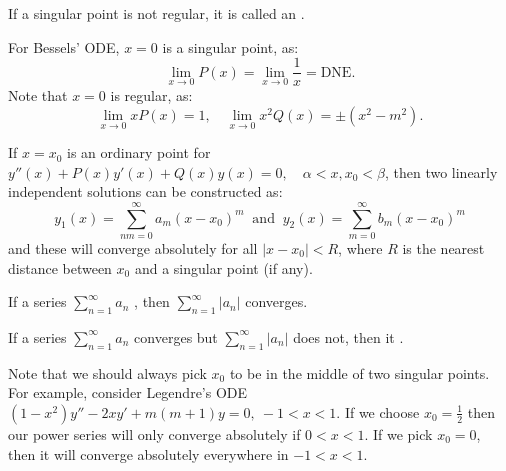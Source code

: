 \documentclass[../main/main.tex]{subfiles}
\begin{document}
\begin{definition}
	If a singular point is not regular, it is called an .
\end{definition}
\begin{remark}
	For Bessels' ODE, $x=0$ is a singular point, as: \[
		\lim\limits_{x \to 0} P(x) = \lim\limits_{x \to 0} \frac{1}{x} = \text{DNE}
	.\] Note that $x=0$ is regular, as: \[
	\lim\limits_{x \to 0} xP(x) = 1,\quad \lim\limits_{x \to 0} x^2Q(x) = \pm(x^2-m^2)
	.\] 
\end{remark}
\begin{theorem}
	If $x=x_0$ is an ordinary point for $y''(x) + P(x) y'(x) + Q(x) y(x)=0, \quad \alpha<x,x_0<\beta$, then two linearly independent solutions can be constructed as: \[
		y_1(x) = \sum_{nm=0}^{\infty} a_m(x-x_0)^{m}\ \text{  and  }\ y_2(x) = \sum_{m=0}^{\infty} b_m(x-x_0)^{m}
	\] and these will converge absolutely for all $|x-x_0|<R$, where $R$ is the nearest distance between  $x_0$ and a singular point (if any).  
\end{theorem}
\begin{definition}
	If a series $\sum_{n=1}^{\infty} a_n$ , then $\sum_{n=1}^{\infty} |a_n|$ converges. 
\end{definition} 
\begin{definition}
	If a series $\sum_{n=1}^{\infty} a_n$ converges but $\sum_{n=1}^{\infty} |a_n|$ does not, then it .
\end{definition}
\begin{remark} Note that we should always pick $x_0$ to be in the middle of two singular points. For example, consider Legendre's ODE $(1-x^2)y''-2xy'+m(m+1)y=0,\ -1<x<1$. If we choose $x_0=\frac{1}{2}$ then our power series will only converge absolutely if $0<x<1$. If we pick $x_0 = 0$, then it will converge absolutely everywhere in $-1<x<1$.
\end{remark}
\end{document}
